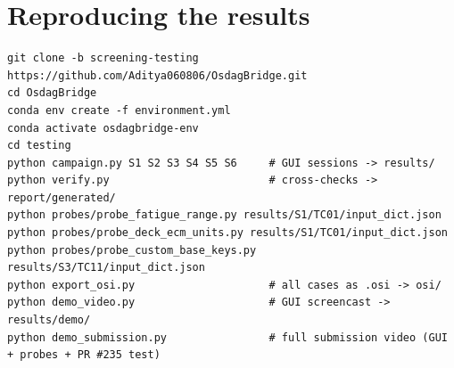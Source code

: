 \documentclass[11pt,a4paper]{article}
\begin{document}
\appendix
\section{Reproducing the results}
\begin{Verbatim}[frame=single,framesep=6pt,fontsize=\footnotesize]
git clone -b screening-testing https://github.com/Aditya060806/OsdagBridge.git
cd OsdagBridge
conda env create -f environment.yml
conda activate osdagbridge-env
cd testing
python campaign.py S1 S2 S3 S4 S5 S6     # GUI sessions -> results/
python verify.py                         # cross-checks -> report/generated/
python probes/probe_fatigue_range.py results/S1/TC01/input_dict.json
python probes/probe_deck_ecm_units.py results/S1/TC01/input_dict.json
python probes/probe_custom_base_keys.py results/S3/TC11/input_dict.json
python export_osi.py                     # all cases as .osi -> osi/
python demo_video.py                     # GUI screencast -> results/demo/
python demo_submission.py                # full submission video (GUI + probes + PR #235 test)
\end{Verbatim}
\end{document}
